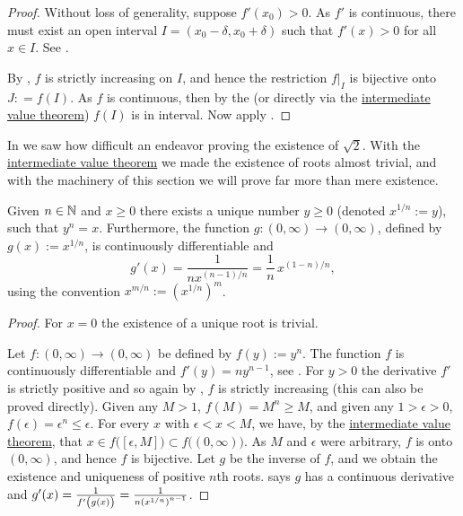 \begin{proof}
Without loss of generality, suppose $f'(x_0) > 0$.  As $f'$ is
continuous, there must exist an open interval $I = (x_0-\delta,x_0+\delta)$ 
such that $f'(x) > 0$ for all $x \in I$.  See
.

By , $f$ is strictly increasing
on $I$, and hence the restriction $f|_{I}$ is bijective onto $J: = f(I)$.
As $f$ is continuous,
then by the
(or directly via the
\hyperref[IVT:thm]{intermediate value theorem})
$f(I)$ is in interval.
Now apply .
\end{proof}

In  we saw how difficult an
endeavor proving the existence of $\sqrt{2}$.
With the \hyperref[IVT:thm]{intermediate value theorem}
we made the existence of roots almost trivial, and
with the machinery of this section we will prove
far more than mere existence.

\begin{cor}
Given $n \in {\mathbb{N}}$ and $x \geq 0$ there exists a unique 
number $y \geq 0$ (denoted $x^{1/n} := y$), such that $y^n = x$.  Furthermore,
the function $g \colon (0,\infty) \to (0,\infty)$, defined by
$g(x) := x^{1/n}$, is continuously differentiable and
\begin{equation*}
g'(x) = \frac{1}{nx^{(n-1)/n}} = \frac{1}{n} \, x^{(1-n)/n} ,
\end{equation*}
using the convention $x^{m/n} := {(x^{1/n})}^{m}$.
\end{cor}

\begin{proof}
For $x=0$ the existence of a unique root is trivial.

Let $f \colon (0,\infty) \to (0,\infty)$ be defined by $f(y) := y^n$.
The function $f$ is continuously differentiable
and $f'(y) = ny^{n-1}$, see .  For $y > 0$ the derivative $f'$ is strictly positive
and so again by , $f$ is strictly
increasing (this can also be proved directly).
Given any $M > 1$, $f(M) = M^n \geq M$, and given any $1 > \epsilon > 0$,
$f(\epsilon) = \epsilon^n \leq \epsilon$.  For every $x$ with $\epsilon < x <
M$, we have, by the
\hyperref[IVT:thm]{intermediate value theorem}, that $x \in
f\bigl( [\epsilon,M] \bigr) \subset
f\bigl( (0,\infty) \bigr)$.  As $M$ and $\epsilon$ were arbitrary, $f$ is onto
$(0,\infty)$, and hence $f$ is bijective.
Let $g$ be the inverse of $f$, and we obtain
the existence and uniqueness of positive
$n$th roots.   says $g$ has a continuous
derivative and $g'(x) =
\frac{1}{f'\left(\vphantom{1^1_1}g(x)\right)} = \frac{1}{n {(x^{1/n})}^{n-1}}$.
\end{proof}

